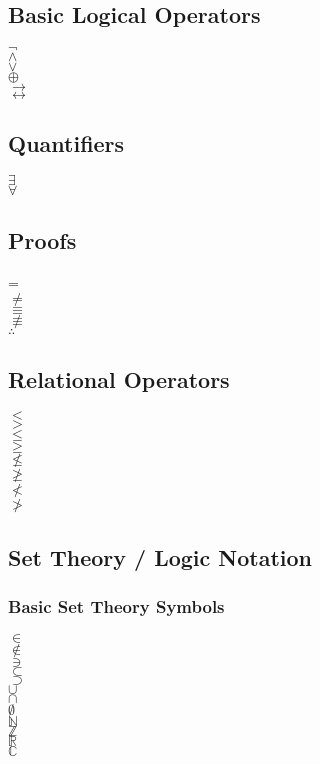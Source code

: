 \documentclass[letterpaper]{article}
\begin{document}
\begin{multicols*}{2}

\subsection*{Basic Logical Operators}
$\neg$\\
$\land$\\
$\lor$\\
$\oplus$\\
$\to$\\
$\leftrightarrow$\\

\subsection*{Quantifiers}
$\exists$\\
$\forall$\\

\subsection*{Proofs}
=\\
$\neq$\\
$\equiv$\\
$\not\equiv$\\
$\therefore$\\

\subsection*{Relational Operators}
$<$\\
$>$\\
$\leq$\\
$\geq$\\
$\nleq$\\
$\ngeq$\\
$\nless$\\
$\ngtr$\\

\subsection*{Set Theory / Logic Notation}
\subsubsection*{Basic Set Theory Symbols}
$\in$\\
$\notin$\\
$\ni$\\
$\subset$\\
$\supset$\\
$\cup$\\
$\cap$\\
$\emptyset$\\
$\mathbb{N}$\\
$\mathbb{Z}$\\
$\mathbb{R}$\\
$\mathbb{C}$\\


\end{multicols*}
\end{document}
